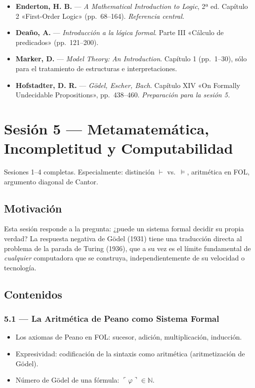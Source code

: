 \documentclass[11pt, letterpaper]{article}
\begin{document}
\begin{lecturas}
\begin{itemize}
  \item[$(\star)$] \textbf{Enderton, H. B.} — \emph{A Mathematical Introduction to Logic}, 2ª ed. Capítulo 2 «First-Order Logic» (pp.\ 68--164). \textit{Referencia central.}
  \item[$(\star)$] \textbf{Deaño, A.} — \emph{Introducción a la lógica formal}. Parte III «Cálculo de predicados» (pp.\ 121--200).
  \item \textbf{Marker, D.} — \emph{Model Theory: An Introduction}. Capítulo 1 (pp.\ 1--30), sólo para el tratamiento de estructuras e interpretaciones.
  \item \textbf{Hofstadter, D. R.} — \emph{Gödel, Escher, Bach}. Capítulo XIV «On Formally Undecidable Propositions», pp.\ 438--460. \textit{Preparación para la sesión 5.}
\end{itemize}
\end{lecturas}

\newpage

\section{Sesión 5 — Metamatemática, Incompletitud y Computabilidad}

\begin{prereqs}
Sesiones 1--4 completas. Especialmente: distinción $\vdash$ vs.\ $\models$, aritmética en FOL, argumento diagonal de Cantor.
\end{prereqs}

\subsection*{Motivación}
Esta sesión responde a la pregunta: ¿puede un sistema formal decidir su propia verdad? La respuesta negativa de Gödel (1931) tiene una traducción directa al problema de la parada de Turing (1936), que a su vez es el límite fundamental de \emph{cualquier} computadora que se construya, independientemente de su velocidad o tecnología.

\subsection{Contenidos}

\subsubsection{5.1 — La Aritmética de Peano como Sistema Formal}
\begin{itemize}
  \item Los axiomas de Peano en FOL: sucesor, adición, multiplicación, inducción.
  \item Expresividad: codificación de la sintaxis como aritmética (aritmetización de Gödel).
  \item Número de Gödel de una fórmula: $\ulcorner\varphi\urcorner\in\mathbb{N}$.
\end{itemize}
\end{document}
